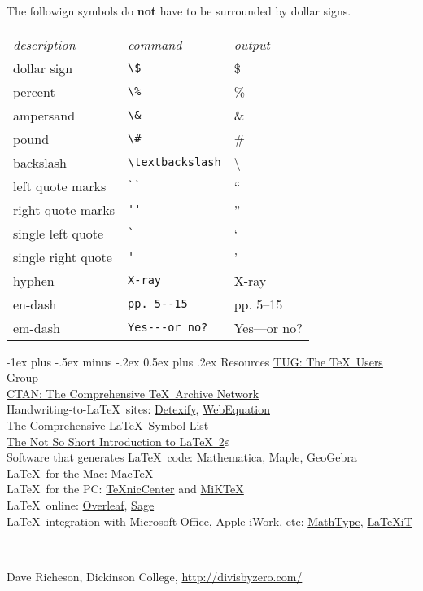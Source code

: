 \documentclass[10pt,landscape]{article}
\makeatletter
\renewcommand{\section}{\@startsection{section}{1}{0mm}%
                                {-1ex plus -.5ex minus -.2ex}%
                                {0.5ex plus .2ex}%
                                {\normalfont\large\bfseries}}
\makeatother
\begin{document}
\begin{multicols}{3}
The followign symbols do \textbf{not} have to be surrounded by dollar signs.

\begin{tabular}{lll}
\emph{description} & \emph{command} & \emph{output}\\
dollar sign & \verb!\$! & \$ \\
percent & \verb!\%! & \% \\
ampersand & \verb!\&! & \& \\
pound & \verb!\#! & \# \\
backslash & \verb!\textbackslash! & \textbackslash \\
left quote marks & \verb!``! & `` \\
right quote marks & \verb!''! & '' \\
single left quote  & \verb!`! & ` \\
single right quote  & \verb!'! & ' \\
hyphen & \verb!X-ray! & X-ray\\
en-dash & \verb!pp. 5--15! & pp. 5--15 \\
em-dash & \verb!Yes---or no?! & Yes---or no? 
\end{tabular}

\section{Resources}
\href{http://www.tug.org/}{TUG: The \TeX\ Users Group}\\
\href{http://www.ctan.org/}{CTAN: The Comprehensive \TeX\ Archive Network}\\
Handwriting-to-\LaTeX\ sites: \href{http://detexify.kirelabs.org/}{Detexify}, \href{http://webdemo.visionobjects.com/equation.html}{WebEquation}\\
\href{ftp://tug.ctan.org/pub/tex-archive/info/symbols/comprehensive/symbols-letter.pdf}{The Comprehensive \LaTeX\ Symbol List}\\ 
\href{http://mirrors.med.harvard.edu/ctan/info/lshort/english/lshort.pdf}{The Not So Short Introduction to \LaTeX\ 2$\varepsilon$}\\
Software that generates \LaTeX\ code: Mathematica, Maple, GeoGebra\\ %
\LaTeX\ for the Mac: \href{http://www.tug.org/mactex/}{Mac\TeX}\\
\LaTeX\ for the PC: \href{http://www.texniccenter.org/}{{\TeX}nicCenter} and \href{http://miktex.org/}{MiK\TeX}\\
\LaTeX\ online: \href{http://www.overleaf.com/}{Overleaf}, \href{http://www.sagemath.org/}{Sage}\\
\LaTeX\ integration with Microsoft Office, Apple iWork, etc: \href{http://www.dessci.com/en/products/mathtype/}{MathType}, \href{http://www.chachatelier.fr/latexit/}{{\LaTeX}{iT}}
\vfill
\hrule
~\\
Dave Richeson, Dickinson College, \href{http://divisbyzero.com/}{http://divisbyzero.com/}
\end{multicols}
\end{document}
